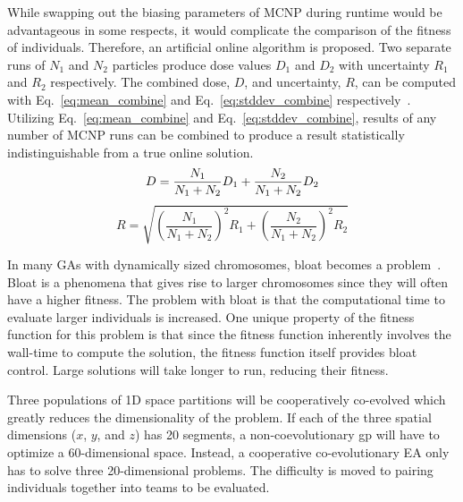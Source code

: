 \documentclass{article}
\begin{document}
While swapping out the biasing parameters of MCNP during runtime would be advantageous in some respects, it would complicate the comparison of the fitness of individuals. Therefore, an artificial online algorithm is proposed. Two separate runs of $N_1$ and $N_2$ particles produce dose values $D_1$ and $D_2$ with uncertainty $R_1$ and $R_2$ respectively. The combined dose, $D$, and uncertainty, $R$, can be computed with Eq.~\ref{eq:mean_combine} and Eq.~\ref{eq:stddev_combine} respectively~\cite{ref:knoll2000}. Utilizing Eq.~\ref{eq:mean_combine} and Eq.~\ref{eq:stddev_combine}, results of any number of MCNP runs can be combined to produce a result statistically indistinguishable from a true online solution.
\begin{equation}\label{eq:mean_combine}
D = \frac{N_1}{N_1 + N_2} D_1 + \frac{N_2}{N_1 + N_2} D_2 \\
\end{equation}
\begin{equation}\label{eq:stddev_combine}
R = \sqrt{\left( \frac{N_1}{N_1 + N_2}\right)^2 R_1 + \left( \frac{N_2}{N_1 + N_2}\right)^2 R_2}
\end{equation}

In many GAs with dynamically sized chromosomes, bloat becomes a problem~\cite{ref:Tanev2012}. Bloat is a phenomena that gives rise to larger chromosomes since they will often have a higher fitness. The problem with bloat is that the computational time to evaluate larger individuals is increased. One unique property of the fitness function for this problem is that since the fitness function inherently involves the wall-time to compute the solution, the fitness function itself provides bloat control. Large solutions will take longer to run, reducing their fitness.

Three populations of 1D space partitions will be cooperatively co-evolved which greatly reduces the dimensionality of the problem. If each of the three spatial dimensions ($x$, $y$, and $z$) has 20 segments, a non-coevolutionary gp will have to optimize a 60-dimensional space. Instead, a cooperative co-evolutionary EA only has to solve three 20-dimensional problems. The difficulty is moved to pairing individuals together into teams to be evaluated.
\end{document}
